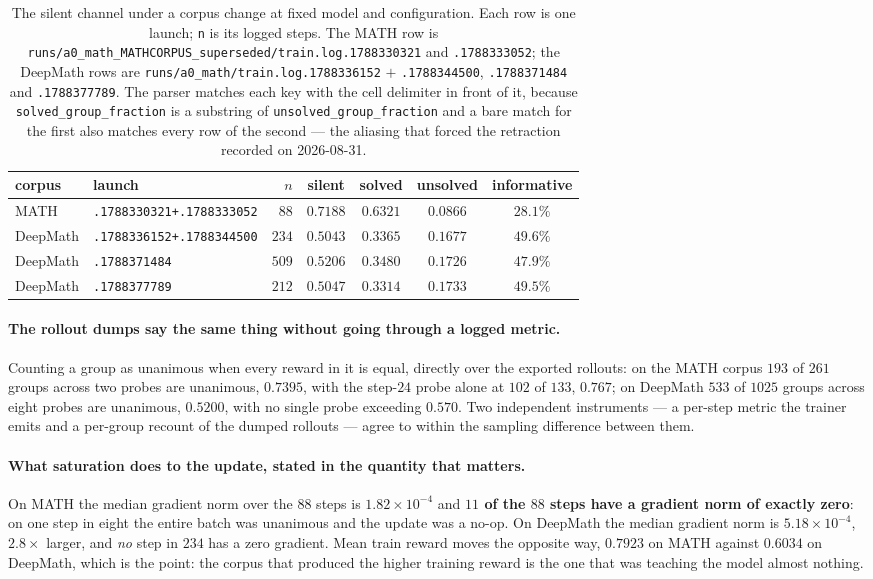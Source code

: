 \begin{table}[t]
\centering\small
\caption{The silent channel under a corpus change at fixed model and configuration. Each row
is one launch; \texttt{n} is its logged steps. The MATH row is
\texttt{runs/a0\_math\_MATHCORPUS\_superseded/train.log.1788330321} and
\texttt{.1788333052}; the DeepMath rows are \texttt{runs/a0\_math/train.log.1788336152}
$+$ \texttt{.1788344500}, \texttt{.1788371484} and \texttt{.1788377789}. The parser matches
each key with the cell delimiter in front of it, because \texttt{solved\_group\_fraction} is
a substring of \texttt{unsolved\_group\_fraction} and a bare match for the first also matches
every row of the second --- the aliasing that forced the retraction recorded on 2026-08-31.}
\label{tab:corpussat}
\begin{tabular}{llrcccc}
\toprule
corpus & launch & $n$ & silent & solved & unsolved & informative \\
\midrule
MATH     & \texttt{.1788330321+.1788333052} & $88$  & $0.7188$ & $0.6321$ & $0.0866$ & $28.1\%$ \\
\midrule
DeepMath & \texttt{.1788336152+.1788344500} & $234$ & $0.5043$ & $0.3365$ & $0.1677$ & $49.6\%$ \\
DeepMath & \texttt{.1788371484}             & $509$ & $0.5206$ & $0.3480$ & $0.1726$ & $47.9\%$ \\
DeepMath & \texttt{.1788377789}             & $212$ & $0.5047$ & $0.3314$ & $0.1733$ & $49.5\%$ \\
\bottomrule
\end{tabular}
\end{table}

\paragraph{The rollout dumps say the same thing without going through a logged metric.}
Counting a group as unanimous when every reward in it is equal, directly over the exported
rollouts: on the MATH corpus $193$ of $261$ groups across two probes are unanimous,
$0.7395$, with the step-$24$ probe alone at $102$ of $133$, $0.767$; on DeepMath $533$ of
$1025$ groups across eight probes are unanimous, $0.5200$, with no single probe exceeding
$0.570$. Two independent instruments --- a per-step metric the trainer emits and a per-group
recount of the dumped rollouts --- agree to within the sampling difference between them.

\paragraph{What saturation does to the update, stated in the quantity that matters.} On MATH
the median gradient norm over the $88$ steps is $1.82\times10^{-4}$ and \textbf{$11$ of the
$88$ steps have a gradient norm of exactly zero}: on one step in eight the entire batch was
unanimous and the update was a no-op. On DeepMath the median gradient norm is
$5.18\times10^{-4}$, $2.8\times$ larger, and \emph{no} step in $234$ has a zero gradient. Mean
train reward moves the opposite way, $0.7923$ on MATH against $0.6034$ on DeepMath, which is
the point: the corpus that produced the higher training reward is the one that was teaching
the model almost nothing.


